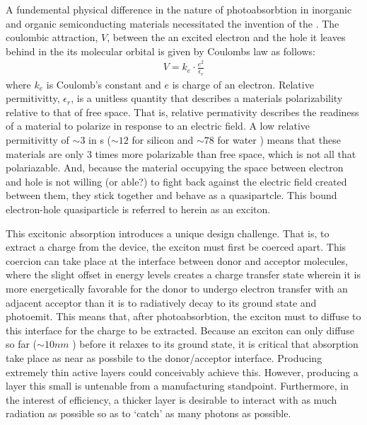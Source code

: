 A fundemental physical difference in the nature of photoabsorbtion in inorganic and organic 
semiconducting materials necessitated the
invention of the . The coulombic attraction, $V$, between the an excited
electron and the hole it leaves behind in the its molecular orbital
is given by Coulombs law as follows:
\begin{align}
    \label{coulomb}
    V  = k_{e} \cdot \frac{e^{2}}{\epsilon_{r}}
\end{align}
where $k_{e}$ is Coulomb's constant and $e$ is charge of an electron. Relative permitivitty,
$\epsilon_{r}$, is a unitless quantity that describes a materials polarizability relative
to that of free space. That is, relative
permativity describes the readiness of a material
to polarize in response to an electric field. A low
relative permitivitty of ${\sim}3$ in s (${\sim}12$ for silicon \cite{Baroni1986} and ${\sim}78$ for water \cite{George2004})
means that these materials are only $3$ times more polarizable than free space, which
is not all that polariazable. And, because the material occupying the space between electron and hole
is not willing (or able?) to fight back against the electric field created between them, they stick together and behave as a quasipartcle. 
This bound electron-hole quasiparticle is referred to herein as an exciton.

This excitonic absorption introduces a unique design challenge.
That is, to extract a charge from the device, the exciton
must first be coerced apart. This coercion can take place at the interface between donor and acceptor molecules,
where the slight offset in energy levels creates a charge transfer state wherein it is more
energetically favorable for the donor to undergo electron transfer with an adjacent acceptor than
it is to radiatively decay to its ground state and photoemit.
This means that, after photoabsorbtion, the exciton must to diffuse to this interface for the charge to be
extracted. Because an exciton can only diffuse so far (${\sim}10nm$ \cite{clarke2010}) before it relaxes to
its ground state, it is critical that absorption take place as near as possbile to the donor/acceptor
interface. 
Producing extremely thin active layers could conceivably achieve this. However,
producing a layer this small is untenable from a manufacturing standpoint. Furthermore, in the interest of
efficiency, a thicker layer
is desirable to interact with as much radiation as possible so as to `catch' as many photons
as possible. 

